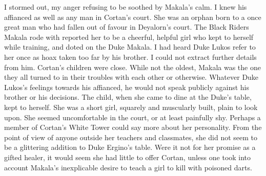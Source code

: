 \documentclass{article}
\begin{document}
I stormed out, my anger refusing to be soothed by Makala's calm. I knew his affianced as well as any man in Cortan's court. She was an orphan born to a once great man who had fallen out of favour in Deyalorn's court. The Black Riders Makala rode with reported her to be a cheerful, helpful girl who kept to herself while training, and doted on the Duke Makala. I had heard Duke Lukos refer to her once as hoax taken too far by his brother. I could not extract further details from him. Cortan's children were close. While not the oldest, Makala was the one they all turned to in their troubles with each other or otherwise. Whatever Duke Lukos's feelings towards his affianced, he would not speak publicly against his brother or his decisions. The child, when she came to dine at the Duke's table, kept to herself. She was a short girl, squarely and muscularly built, plain to look upon. She seemed uncomfortable in the court, or at least painfully shy. Perhaps a member of Cortan's White Tower could say more about her personality. From the point of view of anyone outside her teachers and classmates, she did not seem to be a glittering addition to Duke Ergino's table. Were it not for her promise as a gifted healer, it would seem she had little to offer Cortan, unless one took into account Makala's inexplicable desire to teach a girl to kill with poisoned darts. 
\end{document}
